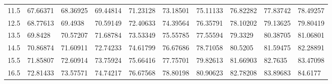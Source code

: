 \documentclass[10pt,twocolumn,letterpaper]{article}
\begin{document}
\begin{table}
\begin{tabular}{llllllllll}
    11.5            & 67.66371                               & 68.36925                               & 69.44814                                & 71.23128                                & 73.18501                                & 75.11133                                & 76.82282                                & 77.83742                                & 78.49257                                \\
    12.5            & 68.77613                               & 69.4938                                & 70.59149                                & 72.40633                                & 74.39564                                & 76.35791                                & 78.10202                                & 79.13625                                & 79.80419                                \\
    13.5            & 69.8428                                & 70.57207                               & 71.68784                                & 73.53349                                & 75.55785                                & 77.55594                                & 79.3329                                 & 80.38705                                & 81.06801                                \\
    14.5            & 70.86874                               & 71.60911                               & 72.74233                                & 74.61799                                & 76.67686                                & 78.71058                                & 80.5205                                 & 81.59475                                & 82.28891                                \\
    15.5            & 71.85807                               & 72.60914                               & 73.75924                                & 75.66416                                & 77.75701                                & 79.82613                                & 81.66903                                & 82.7635                                 & 83.47098                                \\
    16.5            & 72.81433                               & 73.57571                               & 74.74217                                & 76.67568                                & 78.80198                                & 80.90623                                & 82.78208                                & 83.89683                                & 84.6177                                 \\

\end{tabular}
\end{table}
\end{document}
